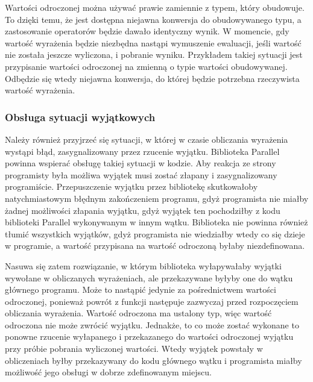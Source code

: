   Wartości odroczonej można używać prawie zamiennie z typem, który obudowuje.
  To dzięki temu, że jest dostępna niejawna konwersja do obudowywanego typu, a zastosowanie operatorów będzie dawało identyczny wynik.
  W momencie, gdy wartość wyrażenia będzie niezbędna nastąpi wymuszenie ewaluacji, jeśli wartość nie została jeszcze wyliczona, i pobranie wyniku.
  Przykładem takiej sytuacji jest przypisanie wartości odroczonej na zmienną o typie wartości obudowywanej.
  Odbędzie się wtedy niejawna konwersja, do której będzie potrzebna rzeczywista wartość wyrażenia.
  
\subsubsection{Obsługa sytuacji wyjątkowych}
  Należy również przyjrzeć się sytuacji, w której w czasie obliczania wyrażenia wystąpi błąd, zasygnalizowany przez rzucenie wyjątku.
  Biblioteka Parallel powinna wspierać obsługę takiej sytuacji w kodzie.
  Aby reakcja ze strony programisty była możliwa wyjątek musi zostać złapany i zasygnalizowany programiście.
  Przepuszczenie wyjątku przez bibliotekę skutkowałoby natychmiastowym błędnym zakończeniem programu, 
  gdyż programista nie miałby żadnej możliwości złapania wyjątku, gdyż wyjątek ten pochodziłby z kodu biblioteki Parallel wykonywanym w innym wątku.
  Biblioteka nie powinna również tłumić wszystkich wyjątków, gdyż programista nie wiedziałby wtedy co się dzieje w programie, a wartość przypisana na wartość odroczoną byłaby niezdefinowana.
  
  Nasuwa się zatem rozwiązanie, w którym biblioteka wyłapywałaby wyjątki wywołane w obliczanych wyrażeniach, ale przekazywane byłyby one do wątku głównego programu.
  Może to nastąpić jedynie za pośrednictwem wartości odroczonej, ponieważ powrót z funkcji \feval następuje zazwyczaj przed rozpoczęciem obliczania wyrażenia.
  Wartość odroczona ma ustalony typ, więc wartość odroczona nie może zwrócić wyjątku.
  Jednakże, to co może zostać wykonane to ponowne rzucenie wyłapanego i przekazanego do wartości odroczonej wyjątku przy próbie pobrania wyliczonej wartości.
  Wtedy wyjątek powstały w obliczeniach byłby przekazywany do kodu głównego wątku i programista miałby możliwość jego obsługi w dobrze zdefinowanym miejscu.
  
